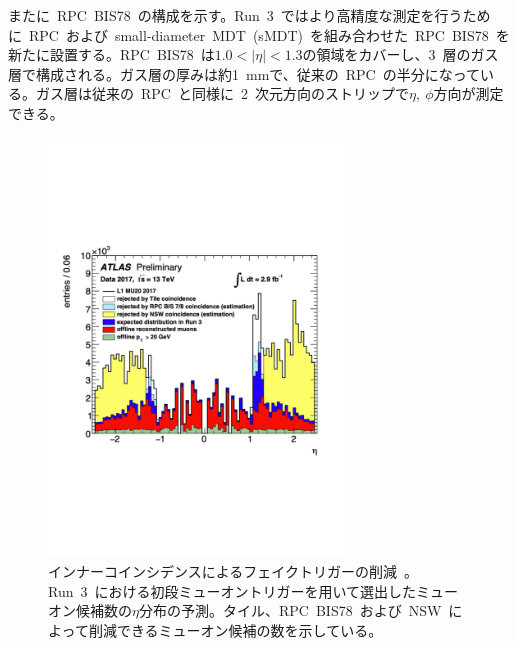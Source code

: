 またに~RPC~BIS78~の構成を示す。Run~3~ではより高精度な測定を行うために~RPC~および~small-diameter~MDT~(sMDT)~を組み合わせた~RPC~BIS78~を新たに設置する。RPC~BIS78~は$1.0<|\eta|<1.3$の領域をカバーし、3~層のガス層で構成される。ガス層の厚みは約1~mmで、従来の~RPC~の半分になっている。ガス層は従来の~RPC~と同様に~2~次元方向のストリップで$\eta,~\phi$方向が測定できる。

\begin{figure}[H]
        \centering   
        \includegraphics[width=0.7\textwidth,page=1]{img/pdf/inner.pdf}
        \caption[インナーコインシデンスによるフェイクトリガーの削減]{インナーコインシデンスによるフェイクトリガーの削減~\cite{TR:06}。Run~3~における初段ミューオントリガーを用いて選出したミューオン候補数の$\eta$分布の予測。タイル、RPC~BIS78~および~NSW~によって削減できるミューオン候補の数を示している。}
        \label{fig:innercoin}
\end{figure}

